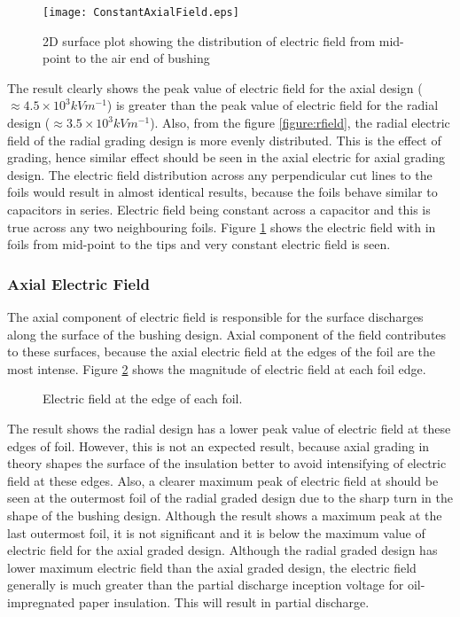 \begin{figure}[!h]
\centering
\texttt{[image: ConstantAxialField.eps]}
\caption{2D surface plot showing the distribution of electric field from mid-point to the air end of bushing}
\label{figure:constantfield}
\end{figure}
The result clearly shows the peak value of electric field for the axial design ($\approx 4.5 \times 10^3 kVm^{-1}$) is greater than the peak value of electric field for the radial design ($\approx 3.5 \times 10^3 kVm^{-1}$). Also, from the figure \ref{figure:rfield}, the radial electric field of the radial grading design is more evenly distributed. This is the effect of grading, hence similar effect should be seen in the axial electric for axial grading design. The electric field distribution across any perpendicular cut lines to the foils would result in almost identical results, because the foils behave similar to capacitors in series. Electric field being constant across a capacitor and this is true across any two neighbouring foils. Figure \ref{figure:constantfield} shows the electric field with in foils from mid-point to the tips and very constant electric field is seen.



\subsubsection{Axial Electric Field}
The axial component of electric field is responsible for the surface discharges along the surface of the bushing design. Axial component of the field contributes to these surfaces, because the axial electric field at the edges of the foil are the most intense. Figure \ref{figure:afield} shows the magnitude of electric field at each foil edge. 

\begin{figure}[!h]
\centering
{}
\caption{Electric field at the edge of each foil.}
\label{figure:afield}
\end{figure}

The result shows the radial design has a lower peak value of electric field at these edges of foil. However, this is not an expected result, because axial grading in theory shapes the surface of the insulation better to avoid intensifying of electric field at these edges. Also, a clearer maximum peak of electric field at should be seen at the outermost foil of the radial graded design due to the sharp turn in the shape of the bushing design. Although the result shows a maximum peak at the last outermost foil, it is not significant and it is below the maximum value of electric field for the axial graded design. Although the radial graded design has lower maximum electric field than the axial graded design, the electric field generally is much greater than the partial discharge inception voltage for oil-impregnated paper insulation. This will result in partial discharge.

